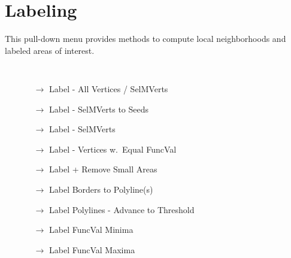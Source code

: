 \section{Labeling}\label{labeling}
This pull-down menu provides methods to compute local neighborhoods and labeled areas of interest. 
{\tt
\begin{itemize}
\item[] 
  \begin{itemize}
  \item[$\rightarrow$] Label - All Vertices / SelMVerts
  \item[$\rightarrow$] Label - SelMVerts to Seeds
  \item[$\rightarrow$] Label - SelMVerts
  \item[$\rightarrow$] Label - Vertices w.~Equal FuncVal
  \item[$\rightarrow$] Label + Remove Small Areas  
  \item[$\rightarrow$] Label Borders to Polyline(s)
  \color{gray}
  \item[$\rightarrow$] Label Polylines - Advance to Threshold
  \color{black}
  \item[$\rightarrow$] Label FuncVal Minima
  \item[$\rightarrow$] Label FuncVal Maxima
  \end{itemize}
 \end{itemize}
 }
 

